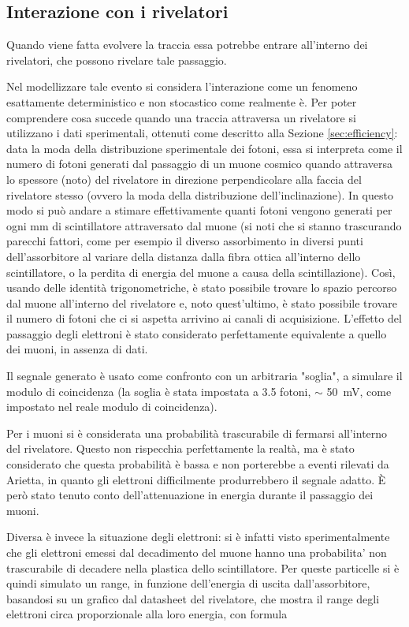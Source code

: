 \subsection{Interazione con i rivelatori}
Quando viene fatta evolvere la traccia essa potrebbe entrare all'interno dei rivelatori, che possono rivelare tale passaggio. 

Nel modellizzare tale evento si considera l'interazione come un fenomeno esattamente deterministico e non stocastico come realmente è. 
Per poter comprendere cosa succede quando una traccia attraversa un rivelatore si utilizzano i dati sperimentali, ottenuti come descritto alla Sezione \ref{sec:efficiency}: data la moda della distribuzione sperimentale dei fotoni, essa si interpreta come il numero di fotoni generati dal passaggio di un muone cosmico quando attraversa lo spessore (noto) del rivelatore in direzione perpendicolare alla faccia del rivelatore stesso (ovvero la moda della distribuzione dell'inclinazione). 
In questo modo si può andare a stimare effettivamente quanti fotoni vengono generati per ogni mm di scintillatore attraversato dal muone (si noti che si stanno trascurando parecchi fattori, come per esempio il diverso assorbimento in diversi punti dell'assorbitore al variare della distanza dalla fibra ottica all'interno dello scintillatore, o la perdita di energia del muone a causa della scintillazione). 
Così, usando delle identità trigonometriche, è stato possibile trovare lo spazio percorso dal muone all'interno del rivelatore e, noto quest'ultimo, è stato possibile trovare il numero di fotoni che ci si aspetta arrivino ai canali di acquisizione. 
L'effetto del passaggio degli elettroni \`e stato considerato perfettamente equivalente a quello dei muoni, in assenza di dati.

Il segnale generato \`e usato come confronto con un arbitraria "soglia", a simulare il modulo di coincidenza (la soglia \`e stata impostata a 3.5 fotoni, $\sim$ 50~mV, come impostato nel reale modulo di coincidenza).

Per i muoni si \`e considerata una probabilit\`a trascurabile di fermarsi all'interno del rivelatore. Questo non rispecchia perfettamente la realt\`a, ma \`e stato considerato che questa probabilit\`a \`e bassa e  non porterebbe a eventi rilevati da Arietta, in quanto gli elettroni difficilmente produrrebbero il segnale adatto. \`E per\`o stato tenuto conto dell'attenuazione in energia durante il passaggio dei muoni.

Diversa \`e invece la situazione degli elettroni: si \`e infatti visto sperimentalmente che gli elettroni emessi dal decadimento del muone hanno una probabilita' non trascurabile di decadere nella plastica dello scintillatore. Per queste particelle si \`e quindi simulato un range, in funzione dell'energia di uscita dall'assorbitore, basandosi su un grafico dal datasheet del rivelatore, che mostra il range degli elettroni circa proporzionale alla loro energia, con formula

